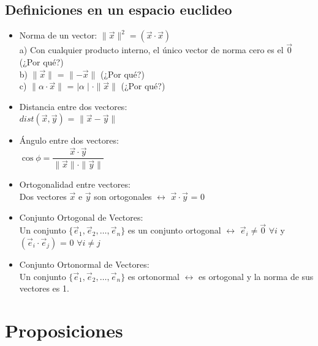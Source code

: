 \documentclass{article}
\begin{document}
\subsection{Definiciones en un espacio euclideo}
\begin{itemize}
\item Norma de un vector: $\parallel\vec{x}\parallel^2 = (\vec{x}\cdot\vec{x})$\\
a) Con cualquier producto interno, el único vector de norma cero es el $\vec{0}$ (¿Por qué?)\\
b) $\parallel\vec{x}\parallel$ = $\parallel-\vec{x}\parallel$ (¿Por qué?)\\
c) $\parallel\alpha\cdot\vec{x}\parallel$ = $\mid\alpha\mid\cdot\parallel\vec{x}\parallel$ (¿Por qué?)
\item Distancia entre dos vectores: \\$dist(\vec{x},\vec{y})$ = $\parallel\vec{x}-\vec{y}\parallel$
\item Ángulo entre dos vectores: \\$\cos \phi = \dfrac{\vec{x}\cdot\vec{y}}{\parallel\vec{x}\parallel\cdot\parallel\vec{y}\parallel}$
\item Ortogonalidad entre vectores: \\
Dos vectores $\vec{x}$ e $\vec{y}$ son ortogonales $\leftrightarrow$ $\vec{x}\cdot\vec{y}$ = $0$
\newpage
\item Conjunto Ortogonal de Vectores: \\
Un conjunto $\{\vec{e}_1, \vec{e}_2, \hdots, \vec{e}_n\}$ es un conjunto ortogonal $\leftrightarrow$ $\vec{e}_i \neq \vec{0}$ $\forall i$ y $(\vec{e}_i\cdot\vec{e}_j)$ = $0$ $\forall i \neq j$
\item Conjunto Ortonormal de Vectores: \\
Un conjunto $\{\vec{e}_1, \vec{e}_2, \hdots, \vec{e}_n\}$ es ortonormal $\leftrightarrow$ es ortogonal y la norma de sus vectores es 1.
\end{itemize}
\section{Proposiciones}
\end{document}
